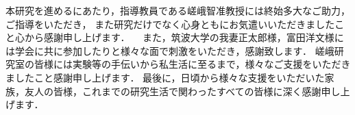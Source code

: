 
\begin{thanks}
  本研究を進めるにあたり，指導教員である嵯峨智准教授には終始多大なご助力，ご指導をいただき，
また研究だけでなく心身ともにお気遣いいただきましたこと心から感謝申し上げます．
　また，筑波大学の我妻正太郎様，富田洋文様には学会に共に参加したりと様々な面で刺激をいただき，感謝致します．
嵯峨研究室の皆様には実験等の手伝いから私生活に至るまで，様々なご支援をいただきましたこと感謝申し上げます．
最後に，日頃から様々な支援をいただいた家族，友人の皆様，これまでの研究生活で関わったすべての皆様に深く感謝申し上げます．
\end{thanks}
